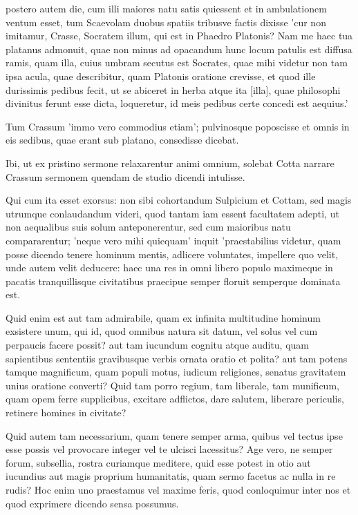 postero autem die, cum illi maiores natu satis quiessent et in ambulationem ventum esset, tum Scaevolam duobus spatiis tribusve factis dixisse 'cur non imitamur, Crasse, Socratem illum, qui est in Phaedro Platonis? Nam me haec tua platanus admonuit, quae non minus ad opacandum hunc locum patulis est diffusa ramis, quam illa, cuius umbram secutus est Socrates, quae mihi videtur non tam ipsa acula, quae describitur, quam Platonis oratione crevisse, et quod ille durissimis pedibus fecit, ut se abiceret in herba atque ita [illa], quae philosophi divinitus ferunt esse dicta, loqueretur, id meis pedibus certe concedi est aequius.'

Tum Crassum 'immo vero commodius etiam'; pulvinosque poposcisse et omnis in eis sedibus, quae erant sub platano, consedisse dicebat.

Ibi, ut ex pristino sermone relaxarentur animi omnium, solebat Cotta narrare Crassum sermonem quendam de studio dicendi intulisse.

Qui cum ita esset exorsus: non sibi cohortandum Sulpicium et Cottam, sed magis utrumque conlaudandum videri, quod tantam iam essent facultatem adepti, ut non aequalibus suis solum anteponerentur, sed cum maioribus natu compararentur; 'neque vero mihi quicquam' inquit 'praestabilius videtur, quam posse dicendo tenere hominum mentis, adlicere voluntates, impellere quo velit, unde autem velit deducere: haec una res in omni libero populo maximeque in pacatis tranquillisque civitatibus praecipue semper floruit semperque dominata est.

Quid enim est aut tam admirabile, quam ex infinita multitudine hominum exsistere unum, qui id, quod omnibus natura sit datum, vel solus vel cum perpaucis facere possit? aut tam iucundum cognitu atque auditu, quam sapientibus sententiis gravibusque verbis ornata oratio et polita? aut tam potens tamque magnificum, quam populi motus, iudicum religiones, senatus gravitatem unius oratione converti? Quid tam porro regium, tam liberale, tam munificum, quam opem ferre supplicibus, excitare adflictos, dare salutem, liberare periculis, retinere homines in civitate?

Quid autem tam necessarium, quam tenere semper arma, quibus vel tectus ipse esse possis vel provocare integer vel te ulcisci lacessitus? Age vero, ne semper forum, subsellia, rostra curiamque meditere, quid esse potest in otio aut iucundius aut magis proprium humanitatis, quam sermo facetus ac nulla in re rudis? Hoc enim uno praestamus vel maxime feris, quod conloquimur inter nos et quod exprimere dicendo sensa possumus.

